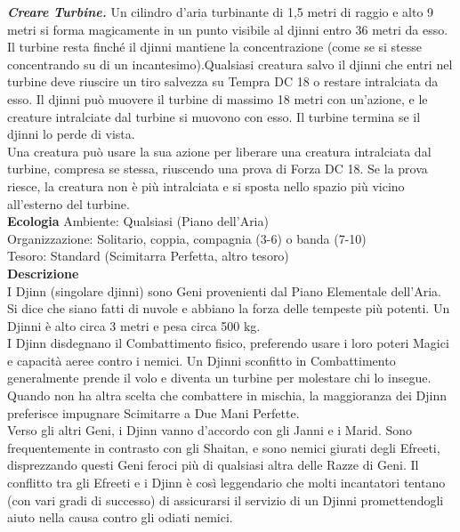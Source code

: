 \begin{multicols}{2}
\emph{\textbf{Creare Turbine.}} Un cilindro d'aria turbinante di 1,5 metri di raggio e alto 9 metri si forma magicamente in un punto visibile al djinni entro 36 metri da esso. Il turbine resta finché il djinni mantiene la concentrazione (come se si stesse concentrando su di un incantesimo).Qualsiasi creatura salvo il djinni che entri nel turbine  deve riuscire un tiro salvezza su Tempra DC 18 o restare intralciata da esso. Il djinni può muovere il turbine di massimo 18 metri con un'azione, e le creature intralciate dal turbine si muovono con esso. Il turbine termina se il djinni lo perde di vista.\\
Una creatura può usare la sua azione per liberare una creatura intralciata dal turbine, compresa se stessa, riuscendo una prova di Forza DC 18. Se la prova riesce, la creatura non è più intralciata e si sposta nello spazio più vicino all'esterno del turbine.\\
\textbf{Ecologia}
Ambiente: Qualsiasi (Piano dell'Aria)\\
Organizzazione: Solitario, coppia, compagnia (3-6) o banda (7-10)\\
Tesoro: Standard (Scimitarra Perfetta, altro tesoro)\\
\textbf{Descrizione}\\
I Djinn (singolare djinni) sono Geni provenienti dal Piano Elementale dell’Aria. Si dice che siano fatti di nuvole e abbiano la forza delle tempeste più potenti. Un Djinni è alto circa 3 metri e pesa circa 500 kg.\\

I Djinn disdegnano il Combattimento fisico, preferendo usare i loro poteri Magici e capacità aeree contro i nemici. Un Djinni sconfitto in Combattimento generalmente prende il volo e diventa un turbine per molestare chi lo insegue. Quando non ha altra scelta che combattere in mischia, la maggioranza dei Djinn preferisce impugnare Scimitarre a Due Mani Perfette.\\

Verso gli altri Geni, i Djinn vanno d’accordo con gli Janni e i Marid. Sono frequentemente in contrasto con gli Shaitan, e sono nemici giurati degli Efreeti, disprezzando questi Geni feroci più di qualsiasi altra delle Razze di Geni. Il conflitto tra gli Efreeti e i Djinn è così leggendario che molti incantatori tentano (con vari gradi di successo) di assicurarsi il servizio di un Djinni promettendogli aiuto nella causa contro gli odiati nemici.\\


\end{multicols}
